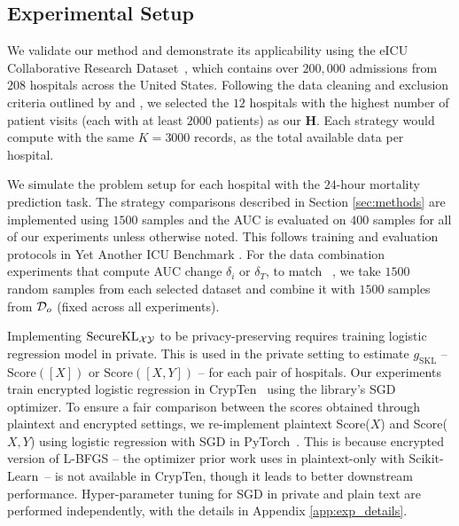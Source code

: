 \subsection{Experimental Setup}
We validate our method and demonstrate its applicability using the eICU Collaborative Research Dataset~\cite{Pollard2018TheEC}, which contains over $200,000$ admissions from $208$ hospitals across the United States. Following the data cleaning and exclusion criteria outlined by \cite{Water2023YetAI} and \cite{shen2024data}, we selected the $12$ hospitals with the highest number of patient visits (each with at least $2000$ patients) as our $\mathbf{H}$. Each strategy would compute with the same $K=3000$ records, as the total available data per hospital.

We simulate the problem setup for each hospital with the $24$-hour mortality prediction task.
The strategy comparisons described in Section \ref{sec:methods} are implemented using $1500$ samples and the AUC is evaluated on $400$ samples for all of our experiments unless otherwise noted. This follows training and evaluation protocols in Yet Another ICU Benchmark \cite{Water2023YetAI}. For the data combination experiments that compute AUC change $\delta_i$ or $\delta_T$, to match ~\priorp, we take $1500$ random samples from each selected dataset and combine it with $1500$ samples from $\mathcal{D}_o$ (fixed across all experiments).

Implementing $\mathrm{Secure}\mathrm{KL}_{\mathcal{X}\mathcal{Y}}$ to be privacy-preserving requires training logistic regression model in private. This is used in the private setting to estimate $g_\mathrm{SKL}$ -- $\mathrm{Score}([X])$ or $\mathrm{Score}([X,Y])$ -- for each pair of hospitals.
Our experiments train encrypted logistic regression in CrypTen~\cite{knott2021crypten} using the library's SGD optimizer. To ensure a fair comparison between the scores obtained through plaintext and encrypted settings, we re-implement plaintext Score($X$) and Score($X,Y$) using logistic regression with SGD in PyTorch~\cite{paszke2019pytorch}. This is because encrypted version of L-BFGS --  the optimizer prior work \priorp uses in plaintext-only with Scikit-Learn~\cite{scikit-learn}-- is not available in CrypTen, though it leads to better downstream performance. Hyper-parameter tuning for SGD in private and plain text are performed independently, with the details in Appendix \ref{app:exp_details}.


